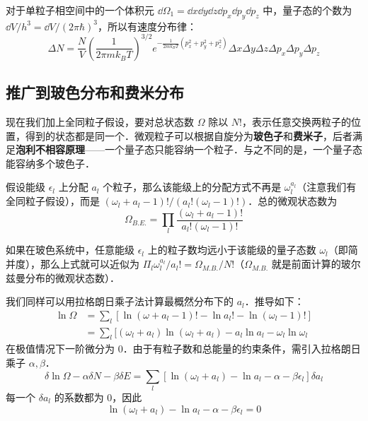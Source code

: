 对于单粒子相空间中的一个体积元 $\dd \Omega_1=\dd x\dd y\dd z\dd p_x\dd p_y\dd p_z$ 中，量子态的个数为 $\dd V/h^3=\dd V/(2\pi \hbar)^3$，所以有速度分布律：
\begin{equation}
\Delta N=\frac{N}{V}\left(\frac{1}{2\pi m k_B T}\right)^{3/2}e^{-\frac{1}{2mk_B T}(p_x^2+p_y^2+p_z^2)}\Delta x\Delta y\Delta z\Delta p_x\Delta p_y\Delta p_z
\end{equation}

\subsection{推广到玻色分布和费米分布}

现在我们加上全同粒子假设，要对总状态数 $\Omega$ 除以 $N!$，表示任意交换两粒子的位置，得到的状态都是同一个．微观粒子可以根据自旋分为\textbf{玻色子}和\textbf{费米子}，后者满足\textbf{泡利不相容原理}——一个量子态只能容纳一个粒子．与之不同的是，一个量子态能容纳多个玻色子．

假设能级 $\epsilon_l$ 上分配 $a_l$ 个粒子，那么该能级上的分配方式不再是 $\omega_l^{a_l}$（注意我们有全同粒子假设），而是 $(\omega_l+a_l-1)!/(a_l!(\omega_l-1)!)$．总的微观状态数为
\begin{equation}
\Omega_{B.E.}=\prod_l \frac{(\omega_l+a_l-1)!}{a_l!(\omega_l-1)!}
\end{equation}

如果在玻色系统中，任意能级 $\epsilon_l$ 上的粒子数均远小于该能级的量子态数 $\omega_l$（即简并度），那么上式就可以近似为 $\Pi_l \omega_l^{a_l}/a_l!=\Omega_{M.B.}/N!$（$\Omega_{M.B.}$ 就是前面计算的玻尔兹曼分布的微观状态数）．

我们同样可以用拉格朗日乘子法计算最概然分布下的 $a_l$．推导如下：
\begin{equation}
\begin{aligned}
\ln \Omega&=\sum_l[\ln (\omega+a_l-1)!-\ln a_l!-\ln (\omega_l-1)!]\\
&=\sum_l[(\omega_l+a_l)\ln(\omega_l+a_l)-a_l\ln a_l-\omega_l\ln \omega_l
\end{aligned}
\end{equation}
在极值情况下一阶微分为 $0$．由于有粒子数和总能量的约束条件，需引入拉格朗日乘子 $\alpha,\beta$．
\begin{equation}
\delta \ln \Omega-\alpha\delta N-\beta\delta E=\sum_l[\ln (\omega_l+a_l)-\ln a_l-\alpha-\beta\epsilon_l]\delta a_l
\end{equation}
每一个 $\delta a_l$ 的系数都为 $0$，因此
\begin{equation}
\ln(\omega_l+a_l)-\ln a_l-\alpha-\beta \epsilon_l=0
\end{equation}

